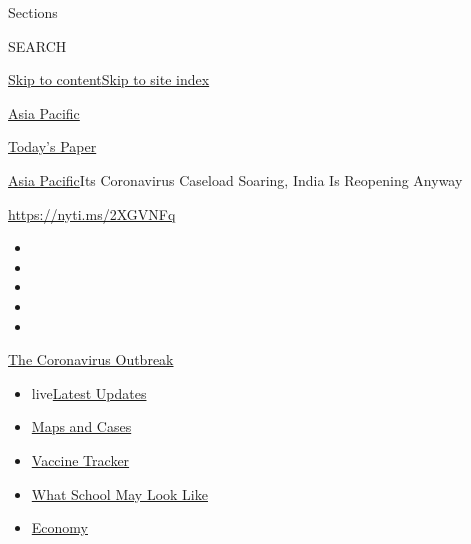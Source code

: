 Sections

SEARCH

\protect\hyperlink{site-content}{Skip to
content}\protect\hyperlink{site-index}{Skip to site index}

\href{https://www.nytimes.com/section/world/asia}{Asia Pacific}

\href{https://myaccount.nytimes.com/auth/login?response_type=cookie\&client_id=vi}{}

\href{https://www.nytimes.com/section/todayspaper}{Today's Paper}

\href{/section/world/asia}{Asia Pacific}\textbar{}Its Coronavirus
Caseload Soaring, India Is Reopening Anyway

\url{https://nyti.ms/2XGVNFq}

\begin{itemize}
\item
\item
\item
\item
\item
\end{itemize}

\href{https://www.nytimes.com/news-event/coronavirus?action=click\&pgtype=Article\&state=default\&region=TOP_BANNER\&context=storylines_menu}{The
Coronavirus Outbreak}

\begin{itemize}
\tightlist
\item
  live\href{https://www.nytimes.com/2020/08/02/world/coronavirus-updates.html?action=click\&pgtype=Article\&state=default\&region=TOP_BANNER\&context=storylines_menu}{Latest
  Updates}
\item
  \href{https://www.nytimes.com/interactive/2020/us/coronavirus-us-cases.html?action=click\&pgtype=Article\&state=default\&region=TOP_BANNER\&context=storylines_menu}{Maps
  and Cases}
\item
  \href{https://www.nytimes.com/interactive/2020/science/coronavirus-vaccine-tracker.html?action=click\&pgtype=Article\&state=default\&region=TOP_BANNER\&context=storylines_menu}{Vaccine
  Tracker}
\item
  \href{https://www.nytimes.com/interactive/2020/07/29/us/schools-reopening-coronavirus.html?action=click\&pgtype=Article\&state=default\&region=TOP_BANNER\&context=storylines_menu}{What
  School May Look Like}
\item
  \href{https://www.nytimes.com/live/2020/07/31/business/stock-market-today-coronavirus?action=click\&pgtype=Article\&state=default\&region=TOP_BANNER\&context=storylines_menu}{Economy}
\end{itemize}

